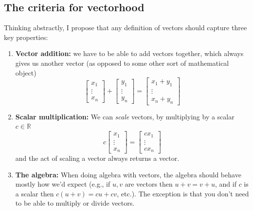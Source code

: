 \documentclass[10pt]{article}
\theoremstyle{definition}
\newcommand{\R}{\mathbb{R}}           %
\begin{document}
\subsection{The criteria for vectorhood}
Thinking abstractly, I propose that any definition of vectors should capture
three key properties:
\begin{enumerate}
  \item \textbf{Vector addition:} we have to be able to add vectors together,
  which always gives us another vector (as opposed to some other sort of
  mathematical object)
  \begin{equation*}
    \begin{bmatrix}
      x_{1}\\\vdots\\x_{n}
    \end{bmatrix}
    +
    \begin{bmatrix}
      y_{1}\\\vdots\\y_{n}
    \end{bmatrix}
    =
    \begin{bmatrix}
      x_{1}+y_{1}\\\vdots\\x_{n}+y_{n}
    \end{bmatrix}
  \end{equation*}
  \item \textbf{Scalar multiplication:} We can \textit{scale} vectors, by
  multiplying by a scalar $c\in \R$
  \begin{equation*}
    c\begin{bmatrix}
      x_{1}\\\vdots\\x_{n}
    \end{bmatrix}
    =
    \begin{bmatrix}
      cx_{1}\\\vdots\\cx_{n}
    \end{bmatrix}
  \end{equation*}
  and the act of scaling a vector always returns a vector.
  \item \textbf{The algebra:} When doing algebra with vectors, the algebra
  should behave mostly how we'd expect (e.g., if $u,v$ are vectors then
  $u+v=v+u$, and if $c$ is a scalar then $c(u+v)=cu+cv$, etc.). The exception
  is that you don't need to be able to multiply or divide vectors.
\end{enumerate}
\end{document}
